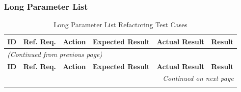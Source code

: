 \documentclass[12pt, titlepage]{article}
\begin{document}
\subsubsection{Long Parameter List}

\begin{longtable}{c
    >{\raggedright\arraybackslash}p{1.5cm}
    >{\raggedright\arraybackslash}p{4.5cm}
    >{\raggedright\arraybackslash}p{4cm}
  >{\raggedright\arraybackslash}p{3cm} c}
  \toprule
  \textbf{ID} & \textbf{Ref. Req.} & \textbf{Action} &
  \textbf{Expected Result} & \textbf{Actual Result} & \textbf{Result} \\
  \midrule
  \endfirsthead

  \multicolumn{6}{l}{\textit{(Continued from previous page)}} \\
  \toprule
  \textbf{ID} & \textbf{Ref. Req.} & \textbf{Action} &
  \textbf{Expected Result} & \textbf{Actual Result} & \textbf{Result} \\
  \midrule
  \endhead

  \multicolumn{6}{r}{\textit{Continued on next page}} \\
  \endfoot

  \bottomrule
  \caption{Long Parameter List Refactoring Test Cases}
  \label{table:long_parameter_list_tests}
  \endlastfoot


\end{longtable}
\end{document}
